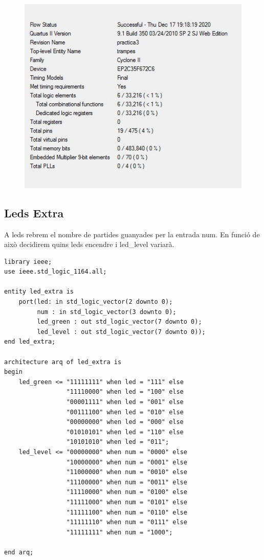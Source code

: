 \documentclass[12pt, a4papre]{article}
\begin{document}
			\begin{figure}[H]
			
	\begin{center}
		\includegraphics[width=130mm]{informeTrampes.jpeg}
		\end{center}
	\end{figure}	

			
			
\subsection{Leds Extra}
	A leds rebrem el nombre de partides guanyades per la entrada num. En funció de això decidirem quins leds encendre i led\_level variarà.

	\begin{lstlisting}[style=vhdl, frame=single, basicstyle=\tiny]
	library ieee;
use ieee.std_logic_1164.all;

entity led_extra is
	port(led: in std_logic_vector(2 downto 0);
		 num : in std_logic_vector(3 downto 0);
		 led_green : out std_logic_vector(7 downto 0);
		 led_level : out std_logic_vector(7 downto 0));
end led_extra;

architecture arq of led_extra is
begin
	led_green <= "11111111" when led = "111" else
				 "11110000" when led = "100" else
				 "00001111" when led = "001" else
				 "00111100" when led = "010" else
				 "00000000" when led = "000" else
				 "01010101" when led = "110" else
				 "10101010" when led = "011";
	led_level <= "00000000" when num = "0000" else
				 "10000000" when num = "0001" else
				 "11000000" when num = "0010" else
				 "11100000" when num = "0011" else
				 "11110000" when num = "0100" else
				 "11111000" when num = "0101" else
				 "11111100" when num = "0110" else
				 "11111110" when num = "0111" else
				 "11111111" when num = "1000";
				 
end arq;
	\end{lstlisting}
	
\end{document}
